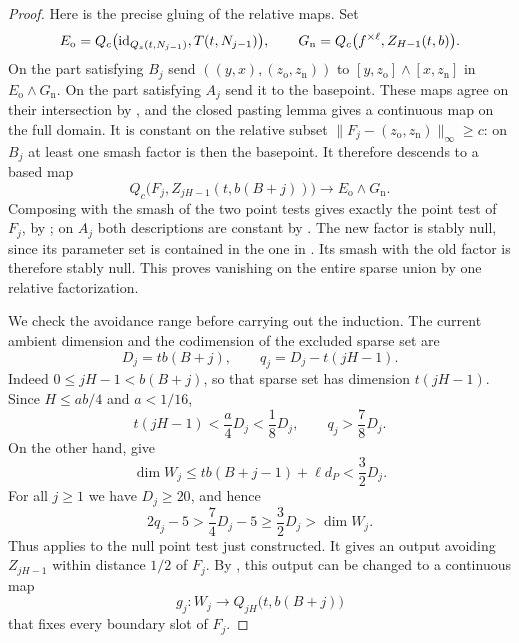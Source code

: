 \begin{proof}
Here is the precise gluing of the relative maps.  Set
\[
 E_{\mathrm o}=Q_c\bigl(\operatorname{id}_{Q_s(t,N_{j-1})},T(t,N_{j-1})\bigr),
 \qquad
 G_{\mathrm n}=Q_c\bigl(f^{\times\ell},Z_{H-1}(t,b)\bigr).
\]
On the part satisfying $B_j$ send $((y,x),(z_{\mathrm o},z_{\mathrm n}))$
to $[y,z_{\mathrm o}]\wedge[x,z_{\mathrm n}]$ in
$E_{\mathrm o}\wedge G_{\mathrm n}$.  On the part satisfying $A_j$
send it to the basepoint.  These maps agree on their intersection
by , and the closed pasting lemma gives
a continuous map on the full domain.  It is constant on the relative
subset $\|F_j-(z_{\mathrm o},z_{\mathrm n})\|_\infty\ge c$:
on $B_j$ at least one smash factor is then the basepoint.  It therefore
descends to a based map
\begin{equation}
 \label{eq:padding-null-map}
 Q_c\bigl(F_j,Z_{jH-1}(t,b(B+j))\bigr)
 \longrightarrow E_{\mathrm o}\wedge G_{\mathrm n}.
\end{equation}
Composing with the smash of the two point tests gives exactly the
point test of $F_j$, by ; on $A_j$ both
descriptions are constant by .  The new
factor is stably null, since its parameter set is contained in the
one in .  Its smash with the old factor is
therefore stably null.  This proves vanishing on the entire sparse
union by one relative factorization.

We check the avoidance range before carrying out the induction.
The current ambient dimension and the codimension of the excluded
sparse set are
\begin{equation}
 \label{eq:padding-dimensions}
 D_j=tb(B+j),\qquad q_j=D_j-t(jH-1).
\end{equation}
Indeed $0\le jH-1<b(B+j)$, so that sparse set has dimension
$t(jH-1)$.  Since $H\le ab/4$ and $a<1/16$,
\[
 t(jH-1)<\frac a4D_j<\frac18D_j,
 \qquad q_j>\frac78D_j.
\]
On the other hand,  give
\[
 \dim W_j\le tb(B+j-1)+\ell d_P
            <\frac32D_j.
\]
For all $j\ge1$ we have $D_j\ge20$, and hence
\begin{equation}
 \label{eq:padding-stable-range}
 2q_j-5>\frac74D_j-5\ge\frac32D_j>\dim W_j.
\end{equation}
Thus  applies to the null point test just
constructed.  It gives an output avoiding $Z_{jH-1}$ within distance
$1/2$ of $F_j$.  By , this output can
be changed to a continuous map
\[
 g_j:W_j\longrightarrow Q_{jH}\bigl(t,b(B+j)\bigr)
\]
that fixes every boundary slot of $F_j$.


\end{proof}
